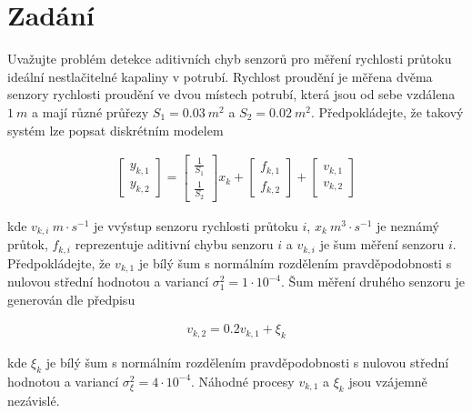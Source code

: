 
\newcommand{\modelmatrix}[1]{\begin{bmatrix} {#1}_{k, 1}\\ {#1}_{k, 2} \end{bmatrix}}
\newcommand{\myvector}[2]{\begin{bmatrix} {#1}\\ {#2} \end{bmatrix}}

\section{Zadání}

Uvažujte problém detekce aditivních chyb senzorů pro měření rychlosti průtoku ideální nestlačitelné kapaliny v potrubí. Rychlost proudění je měřena dvěma senzory rychlosti proudění ve dvou místech potrubí, která jsou od sebe vzdálena \( 1 \: m \) a mají různé průřezy \( S_1 = 0.03 \: m^2 \) a \( S_2 = 0.02 \: m^2 \). Předpokládejte, že takový systém lze popsat diskrétním modelem 

\begin{align}
    \modelmatrix{y} =
    \begin{bmatrix} \frac{1}{S_1}\\ \frac{1}{S_2} \end{bmatrix}
    x_k + \modelmatrix{f} + \modelmatrix{v}
\end{align}

kde \( v_{k, i} \: m \cdot s^{-1} \) je vvýstup senzoru rychlosti průtoku \( i \), \( x_k \: m^3 \cdot s^{-1} \) je neznámý průtok, \( f_{k, i} \) reprezentuje aditivní chybu senzoru \( i \) a \( v_{k, i} \) je šum měření senzoru \( i \). Předpokládejte, že \( v_{k, 1} \) je bílý šum s normálním rozdělením pravděpodobnosti s nulovou střední hodnotou a variancí \( \sigma^2_1 = 1 \cdot 10^{−4} \). Šum měření druhého senzoru je generován dle předpisu

\begin{align}
    v_{k, 2} = 0.2 v_{k, 1} + \xi_k
\end{align}

kde \( \xi_k \) je bílý šum s normálním rozdělením pravděpodobnosti s nulovou střední hodnotou a variancí \( \sigma^2_\xi = 4 \cdot 10^{−4} \). Náhodné procesy \( v_{k, 1} \) a \( \xi_k \) jsou vzájemně nezávislé.

